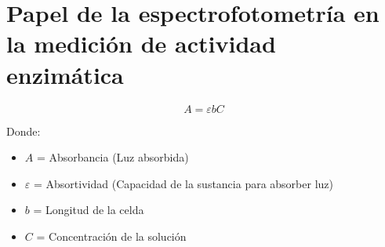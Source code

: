 \section{Papel de la espectrofotometría en la medición de actividad enzimática}

\begin{equation}
    A = \varepsilon b C
\end{equation}

Donde:

\begin{itemize}
    \item $A$ = Absorbancia (Luz absorbida)
    \item $\varepsilon$ = Absortividad (Capacidad de la sustancia para absorber luz) 
    \item $b$ = Longitud de la celda
    \item $C$ = Concentración de la solución
\end{itemize}